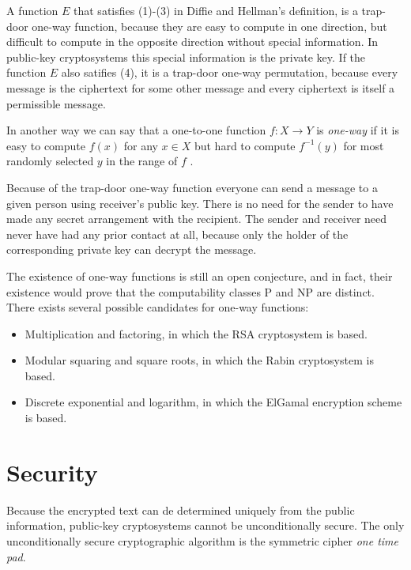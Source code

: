 \documentclass[english,titlepage,11pt]{article}
\begin{document}
A function $E$ that satisfies (1)-(3) in Diffie and Hellman's definition, is a trap-door one-way function, because they are easy to compute in one direction, but difficult to compute in the opposite direction without special information. In public-key cryptosystems this special information is the private key. If the function $E$ also satifies (4), it is a trap-door one-way permutation, because every message is the ciphertext for some other message and every ciphertext is itself a permissible message\cite{rsa78}.

In another way we can say that a one-to-one function $f : X \rightarrow Y$ is \emph{one-way} if it is easy to compute $f(x)$ for any $x \in X$ but hard to compute $f^{-1}(y)$ for most randomly selected $y$ in the range of $f$ \cite{koblitz04,menezes01}.

Because of the trap-door one-way function everyone can send a message to a given person using receiver's public key. There is no need for the sender to have made any secret arrangement with the recipient. The sender and receiver need never have had any prior contact at all, because only the holder of the corresponding private key can decrypt the message\cite{diffie88,koblitz04}.

The existence of one-way functions is still an open conjecture, and in fact, their existence would prove that the computability classes P and NP are distinct\cite{goldreich01}. There exists several possible candidates for one-way functions:

\begin{itemize}
	\item Multiplication and factoring, in which the RSA cryptosystem is based\cite{rsa78,rivest03}.
	\item Modular squaring and square roots, in which the Rabin cryptosystem is based\cite{rabin79}.
	\item Discrete exponential and logarithm, in which the ElGamal encryption scheme is based\cite{elgamal85}.
\end{itemize}

\section{Security}

Because the encrypted text can de determined uniquely from the public information, public-key cryptosystems cannot be unconditionally secure\cite{diffie76}. The only unconditionally secure cryptographic algorithm is the symmetric cipher \emph{one time pad}\cite{kahn67}. 
\end{document}

